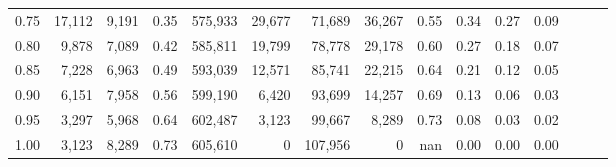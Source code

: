 \begin{tabular}{rrrrrrrrrrrrrrr}
0.75 &  17,112 &  9,191 &  0.35 &  575,933 &   29,677 &   71,689 &   36,267 &  0.55 &  0.34 &  0.27 &      0.09 \\
0.80 &   9,878 &  7,089 &  0.42 &  585,811 &   19,799 &   78,778 &   29,178 &  0.60 &  0.27 &  0.18 &      0.07 \\
0.85 &   7,228 &  6,963 &  0.49 &  593,039 &   12,571 &   85,741 &   22,215 &  0.64 &  0.21 &  0.12 &      0.05 \\
0.90 &   6,151 &  7,958 &  0.56 &  599,190 &    6,420 &   93,699 &   14,257 &  0.69 &  0.13 &  0.06 &      0.03 \\
0.95 &   3,297 &  5,968 &  0.64 &  602,487 &    3,123 &   99,667 &    8,289 &  0.73 &  0.08 &  0.03 &      0.02 \\
1.00 &   3,123 &  8,289 &  0.73 &  605,610 &        0 &  107,956 &        0 &   nan &  0.00 &  0.00 &      0.00 \\
\bottomrule
\end{tabular}
